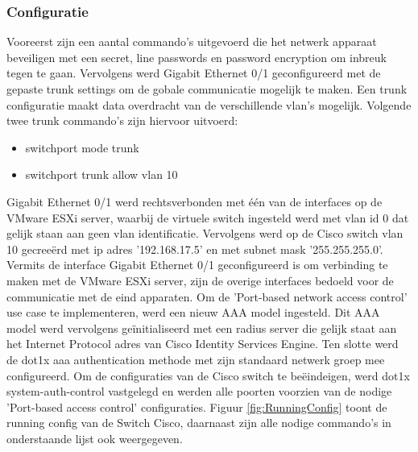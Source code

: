 \subsubsection{Configuratie}
\label{sec:config}
Vooreerst zijn een aantal commando's uitgevoerd die het netwerk apparaat beveiligen met een secret, line passwords en password encryption om inbreuk tegen te gaan. Vervolgens werd Gigabit Ethernet 0/1 geconfigureerd met de gepaste trunk settings om de gobale communicatie mogelijk te maken. Een trunk configuratie maakt data overdracht van de verschillende vlan's mogelijk. Volgende twee trunk commando's zijn hiervoor uitvoerd:  

\begin{itemize}
	\item switchport mode trunk
	\item switchport trunk allow vlan 10 
\end{itemize}

Gigabit Ethernet 0/1 werd rechtsverbonden met één van de interfaces op de VMware ESXi server, waarbij de virtuele switch ingesteld werd met vlan id 0 dat gelijk staan aan geen vlan identificatie. Vervolgens werd
op de Cisco switch vlan 10 gecreeërd met ip adres '192.168.17.5' en met subnet mask '255.255.255.0'. Vermits de interface Gigabit Ethernet 0/1 geconfigureerd is om verbinding te maken met de VMware ESXi server, zijn de overige interfaces bedoeld voor de communicatie met de eind apparaten. 
\newline
\newline
Om de 'Port-based network access control' use case te implementeren, werd een nieuw AAA model ingesteld. Dit AAA model werd vervolgens geïnitialiseerd met een radius server die gelijk staat aan het Internet Protocol adres van Cisco Identity Services Engine. Ten slotte werd de dot1x aaa authentication methode met zijn standaard netwerk groep mee configureerd. 
\newline
\newline
Om de configuraties van de Cisco switch te beëindeigen, werd dot1x system-auth-control vastgelegd en werden alle poorten voorzien van de nodige 'Port-based access control' configuraties. Figuur \ref{fig:RunningConfig} toont de running config van de Switch Cisco, daarnaast zijn alle nodige commando's in onderstaande lijst ook weergegeven.

